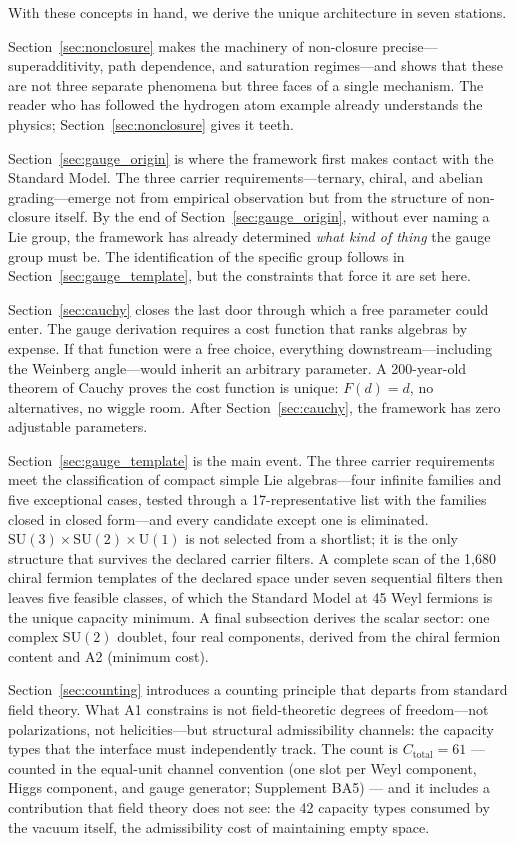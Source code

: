 \documentclass[11pt]{article}
\newcommand{\SU}{\mathrm{SU}}
\newcommand{\U}{\mathrm{U}}
\begin{document}
With these concepts in hand, we derive the unique architecture in seven stations.

Section~\ref{sec:nonclosure} makes the machinery of non-closure precise---superadditivity, path dependence, and saturation regimes---and shows that these are not three separate phenomena but three faces of a single mechanism.  The reader who has followed the hydrogen atom example already understands the physics; Section~\ref{sec:nonclosure} gives it teeth.

Section~\ref{sec:gauge_origin} is where the framework first makes contact with the Standard Model.  The three carrier requirements---ternary, chiral, and abelian grading---emerge not from empirical observation but from the structure of non-closure itself.  By the end of Section~\ref{sec:gauge_origin}, without ever naming a Lie group, the framework has already determined \emph{what kind of thing} the gauge group must be.  The identification of the specific group follows in Section~\ref{sec:gauge_template}, but the constraints that force it are set here.

Section~\ref{sec:cauchy} closes the last door through which a free parameter could enter.  The gauge derivation requires a cost function that ranks algebras by expense.  If that function were a free choice, everything downstream---including the Weinberg angle---would inherit an arbitrary parameter.  A 200-year-old theorem of Cauchy proves the cost function is unique: $F(d) = d$, no alternatives, no wiggle room.  After Section~\ref{sec:cauchy}, the framework has zero adjustable parameters.

Section~\ref{sec:gauge_template} is the main event.  The three carrier requirements meet the classification of compact simple Lie algebras---four infinite families and five exceptional cases, tested through a 17-representative list with the families closed in closed form---and every candidate except one is eliminated.  $\SU(3) \times \SU(2) \times \U(1)$ is not selected from a shortlist; it is the only structure that survives the declared carrier filters.  A complete scan of the 1{,}680 chiral fermion templates of the declared space under seven sequential filters then leaves five feasible classes, of which the Standard Model at 45 Weyl fermions is the unique capacity minimum.  A final subsection derives the scalar sector: one complex $\SU(2)$ doublet, four real components, derived from the chiral fermion content and A2 (minimum cost).

Section~\ref{sec:counting} introduces a counting principle that departs from standard field theory.  What A1 constrains is not field-theoretic degrees of freedom---not polarizations, not helicities---but structural admissibility channels: the capacity types that the interface must independently track.  The count is $C_{\mathrm{total}} = 61$ --- counted in the equal-unit channel convention (one slot per Weyl component, Higgs component, and gauge generator; Supplement BA5) --- and it includes a contribution that field theory does not see: the 42 capacity types consumed by the vacuum itself, the admissibility cost of maintaining empty space.
\end{document}
